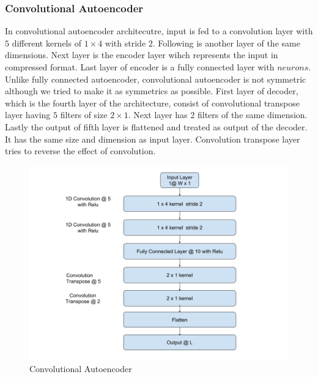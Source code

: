 \documentclass[12pt]{article}
\begin{document}
\subsubsection{Convolutional Autoencoder } 
In convolutional autoencoder architecutre, input is fed to a convolution layer with $5$ different kernels of $1 \times 4$ with stride $2$. Following is another layer of the same dimensions. Next layer is the encoder layer wihch represents the input in compressed format. Last layer of encoder is a fully connected layer with $neurons$. Unlike fully connected autoencoder, convolutional autoencoder is not symmetric although we tried to make it as symmetrics as possible. First layer of decoder, which is the fourth layer of the architecture, consist of convolutional transpose layer having $5$ filters of size $2 \times 1$. Next layer has $2$ filters of the same dimension. Lastly the output of fifth layer is flattened and treated as output of the decoder. It has the same size and dimension as input layer. Convolution transpose layer tries to reverse the effect of convolution. 
\begin{figure}[H]
\centering
        \includegraphics[width=\textwidth]{images/architecture/CnnAutoencoder.png}
    \caption{Convolutional Autoencoder}
    \label{cnnAutoencoder}
\end{figure}
\newpage
\end{document}

